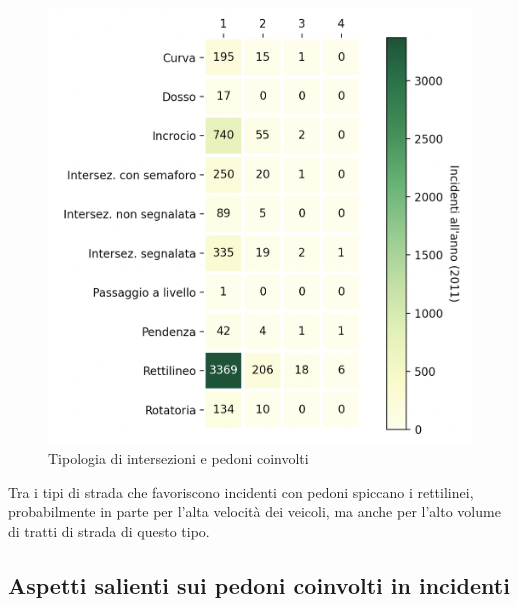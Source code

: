 \documentclass[a4paper]{report}
\begin{document}
\begin{figure}
    \includegraphics[width=\linewidth]{../src/incidenti/incidenti_senza_coords/pedoni/pedoni_incroci.png}
    \caption{Tipologia di intersezioni e pedoni coinvolti}
    \label{fig:pedoni-intersezioni}
\end{figure}

Tra i tipi di strada che favoriscono incidenti con pedoni spiccano i rettilinei, 
probabilmente in parte per l'alta velocità dei veicoli, ma anche per l'alto volume di
tratti di strada di questo tipo.


\subsection{Aspetti salienti sui pedoni coinvolti in incidenti}
\end{document}
